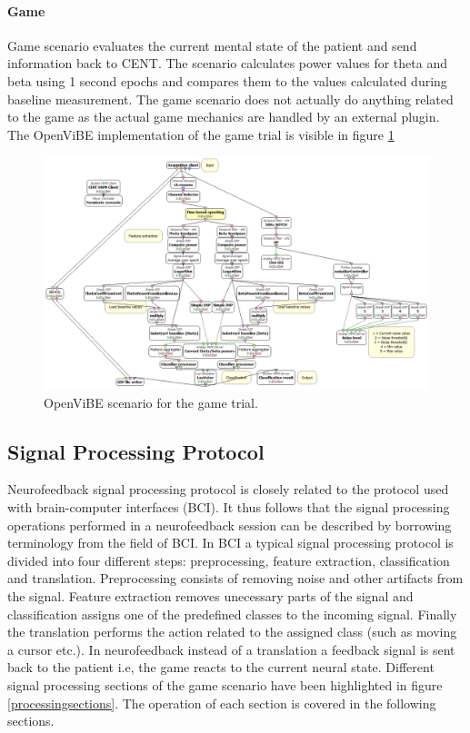 \paragraph{Game}
Game scenario evaluates the current mental state of the patient and send information back to CENT. The scenario calculates power values for theta and beta using 1 second epochs and compares them to the values calculated during baseline measurement. The game scenario does not actually do anything related to the game as the actual game mechanics are handled by an external plugin. The OpenViBE implementation of the game trial is visible in figure \ref{gametrial}

\begin{figure}[h]
	\centering
	\includegraphics[scale=0.3]{game.png}
	\caption{OpenViBE scenario for the game trial.}\label{gametrial}
\end{figure}
  
\subsection{Signal Processing Protocol}
Neurofeedback signal processing protocol is closely related to the protocol used with brain-computer interfaces (BCI). It thus follows that the signal processing operations performed in a neurofeedback session can be described by borrowing terminology from the field of BCI. In BCI a typical signal processing protocol is divided into four different steps: preprocessing, feature extraction, classification and translation. Preprocessing consists of removing noise and other artifacts from the signal. Feature extraction removes unecessary parts of the signal and classification assigns one of the predefined classes to the incoming signal. Finally the translation performs the action related to the assigned class (such as moving a cursor etc.). In neurofeedback instead of a translation a feedback signal is sent back to the patient i.e, the game reacts to the current neural state. Different signal processing sections of the game scenario have been highlighted in figure \ref{processingsections}. The operation of each section is covered in the following sections.

